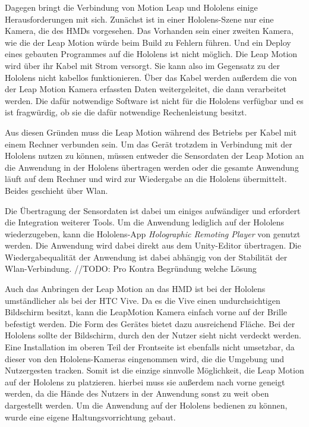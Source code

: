 Dagegen bringt die Verbindung von Motion Leap und Hololens einige Herausforderungen mit sich. Zunächst ist in einer Hololens-Szene nur eine Kamera, die des HMDs vorgesehen. Das Vorhanden sein einer zweiten Kamera, wie die der Leap Motion würde beim Build zu Fehlern führen. Und ein Deploy eines gebauten Programmes auf die Hololens ist nicht möglich.
Die Leap Motion wird über ihr Kabel mit Strom versorgt. Sie kann also im Gegensatz zu der Hololens nicht kabellos funktionieren. 
Über das Kabel werden außerdem die von der Leap Motion Kamera erfassten Daten weitergeleitet, die dann verarbeitet werden. Die dafür notwendige Software ist nicht für die Hololens verfügbar und es ist fragwürdig, ob sie die dafür notwendige Rechenleistung besitzt. 

Aus diesen Gründen muss die Leap Motion während des Betriebs per Kabel mit einem Rechner verbunden sein. Um das Gerät trotzdem in Verbindung mit der Hololens nutzen zu können, müssen entweder die Sensordaten der Leap Motion an die Anwendung in der Hololens übertragen werden oder die gesamte Anwendung läuft auf dem Rechner und wird zur Wiedergabe an die Hololens übermittelt. Beides geschieht über Wlan.

Die Übertragung der Sensordaten ist dabei um einiges aufwändiger und erfordert die Integration weiterer Tools. 
Um die Anwendung lediglich auf der Hololens wiederzugeben, kann die Hololens-App \textit{Holographic Remoting Player} von \citet{remoteApp} genutzt werden. Die Anwendung wird dabei direkt aus dem Unity-Editor übertragen.
Die Wiedergabequalität der Anwendung ist dabei abhängig von der Stabilität der Wlan-Verbindung.
//TODO:
Pro Kontra Begründung welche Lösung

Auch das Anbringen der Leap Motion an das HMD ist bei der Hololens umständlicher als bei der HTC Vive. 
Da es die Vive einen undurchsichtigen Bildschirm besitzt, kann die LeapMotion Kamera einfach vorne auf der Brille befestigt werden. Die Form des Gerätes bietet dazu ausreichend Fläche.
Bei der Hololens sollte der Bildschirm, durch den der Nutzer sieht nicht verdeckt werden. Eine Installation  im oberen Teil der Frontseite ist ebenfalls nicht umsetzbar, da dieser von den Hololens-Kameras eingenommen wird, die die Umgebung und Nutzergesten tracken.
Somit ist die einzige sinnvolle Möglichkeit, die Leap Motion auf der Hololens zu platzieren. hierbei muss sie außerdem nach vorne geneigt werden, da die Hände des Nutzers in der Anwendung sonst zu weit oben dargestellt werden. 
Um die Anwendung auf der Hololens bedienen zu können, wurde eine eigene Haltungsvorrichtung gebaut.


